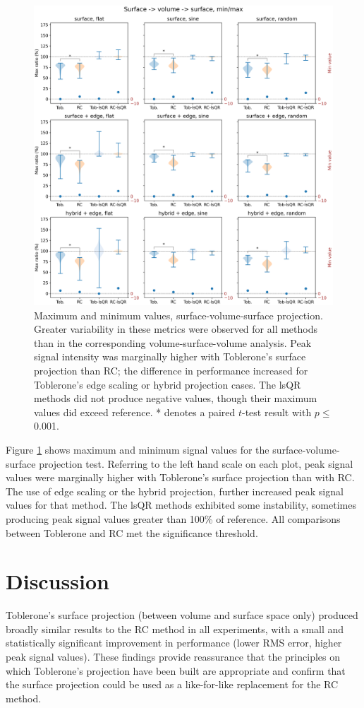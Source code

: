 \documentclass[12pt]{report}
\begin{document}
\begin{figure}[H]
\centering
\includegraphics[width=\textwidth]{SVS_minmax}
\caption{Maximum and minimum values, surface-volume-surface projection. Greater variability in these metrics were observed for all methods than in the corresponding volume-surface-volume analysis. Peak signal intensity was marginally higher with Toblerone's surface projection than RC; the difference in performance increased for Toblerone's edge scaling or hybrid projection cases. The lsQR methods did not produce negative values, though their maximum values did exceed reference. * denotes a paired $t$-test result with $p\leq $ 0.001.}
\label{SVS_minmax} 
\end{figure}

Figure \ref{SVS_minmax} shows maximum and minimum signal values for the surface-volume-surface projection test. Referring to the left hand scale on each plot, peak signal values were marginally higher with Toblerone's surface projection than with RC. The use of edge scaling or the hybrid projection, further increased peak signal values for that method. The lsQR methods exhibited some instability, sometimes producing peak signal values greater than 100\% of reference. All comparisons  between Toblerone and RC met the significance threshold. 

\section{Discussion}
Toblerone's surface projection (between volume and surface space only) produced broadly similar results to the RC method in all experiments, with a small and statistically significant improvement in performance (lower RMS error, higher peak signal values). These findings provide reassurance that the principles on which Toblerone's projection have been built are appropriate and confirm that the surface projection could be used as a like-for-like replacement for the RC method. 
\end{document}
